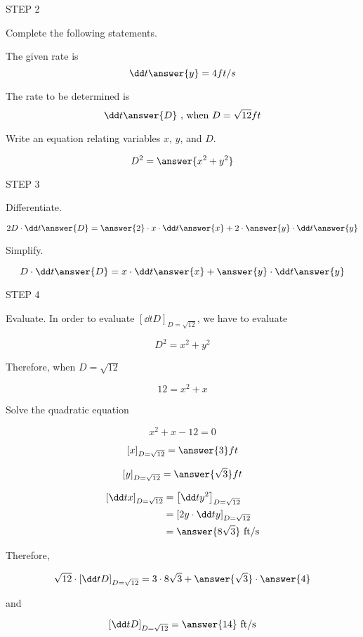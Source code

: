 \documentclass{ximera}
\begin{document}
\begin{exercise}
STEP 2

Complete the following statements.

The given rate is
 \[
\dd t \answer{y}= 4 ft/s
\]

The  rate to be determined is
\[
\dd t \answer{D} \text{    , when    } D=\sqrt{12} ft
\]

Write an equation relating variables $x$, $y$, and  $D$.

\[
D^2=\answer{x^2+y^2}
\]

STEP 3

Differentiate.

\[
2 D\cdot \dd t{\answer{D}}=\answer{2}\cdot x\cdot  \dd t{\answer{x}}+2\cdot\answer{y}\cdot  \dd t{\answer{y}}
\]

Simplify.

\[
 D\cdot \dd t{\answer{D}}=x\cdot  \dd t{\answer{x}}+\answer{y}\cdot  \dd t{\answer{y}}
\]


STEP 4

Evaluate. In order to evaluate $\left[\dd t{D}\right]_{D=\sqrt{12}}$, we have to evaluate


\begin{hint}
\[
D^2=x^2+y^2
\]

Therefore, when $D=\sqrt{12}$

\[
12=x^2+x
\]


Solve the quadratic equation

\[
x^2+x-12=0
\]
\end{hint}


\[
\left[x\right]_{D=\sqrt{12}}=\answer{3} ft
\]

\[
\left[y\right]_{D=\sqrt{12}}=\answer{\sqrt{3}} ft
\]


\begin{align}
\left[\dd t{x}\right]_{D=\sqrt{12}}&=\left[\dd t{y^2}\right]_{D=\sqrt{12}}\\
&=\left[2y\cdot \dd t{y}\right]_{D=\sqrt{12}}\\
&=\answer{8\sqrt{3}}\text{   ft/s}\\
\end{align}

Therefore,

\[
 \sqrt{12}\cdot \left[\dd t{D}\right]_{D=\sqrt{12}}=3\cdot  8\sqrt{3}+\answer{\sqrt{3}}\cdot {\answer{4}}
\]


and

\[
 \left[\dd t{D}\right]_{D=\sqrt{12}}= \answer{14} \text{  ft/s}
\]
\end{exercise}
\end{document}
